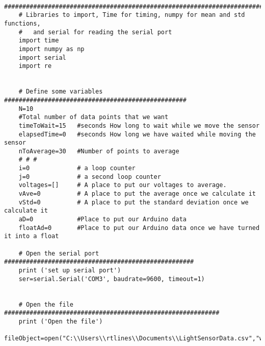 \begin{verbatim}
	##########################################################################
	# Libraries to import, Time for timing, numpy for mean and std functions, 
	#   and serial for reading the serial port
	import time
	import numpy as np
	import serial
	import re
	
	
	# Define some variables ##################################################
	N=10
	#Total number of data points that we want
	timeToWait=15   #seconds How long to wait while we move the sensor
	elapsedTime=0   #seconds How long we have waited while moving the sensor
	nToAverage=30   #Number of points to average
	# # #
	i=0             # a loop counter
	j=0             # a second loop counter
	voltages=[]     # A place to put our voltages to average.
	vAve=0          # A place to put the average once we calculate it
	vStd=0          # A place to put the standard deviation once we calculate it
	aD=0            #Place to put our Arduino data 
	floatAd=0       #Place to put our Arduino data once we have turned it into a float
	
	# Open the serial port ####################################################
	print ('set up serial port')
	ser=serial.Serial('COM3', baudrate=9600, timeout=1)
	
	
	# Open the file ###########################################################
	print ('Open the file')
	fileObject=open("C:\\Users\\rtlines\\Documents\\LightSensorData.csv","w")
	

\end{verbatim}
